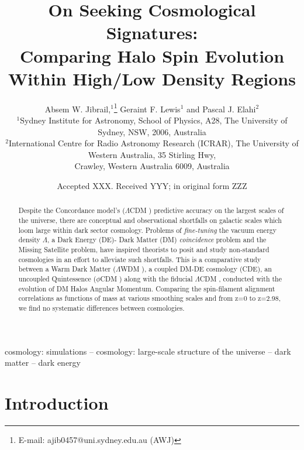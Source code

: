 \documentclass[a4paper,fleqn,usenatbib]{mnras}
\title[Seeking cosmological signatures Within \textit{N}-Body Simulations]{On Seeking Cosmological Signatures:\\ Comparing Halo Spin Evolution Within High/Low Density Regions }
\author[A. W. Jibrail et al.]{
Absem W. Jibrail,$^{1}$\thanks{E-mail: ajib0457@uni.sydney.edu.au (AWJ)}
Geraint F. Lewis$^{1}$
and Pascal J. Elahi$^{2}$
\\
$^{1}$Sydney Institute for Astronomy, School of Physics, A28, The University of Sydney, NSW, 2006, Australia\\
$^{2}$International Centre for Radio Astronomy Research (ICRAR), The University of Western Australia, 35 Stirling Hwy, \\
Crawley, Western Australia 6009, Australia}
\date{Accepted XXX. Received YYY; in original form ZZZ}
\def \lcdm{$\Lambda$CDM }
\def \lwdm{$\Lambda$WDM }
\def \qcdm{$\phi$CDM }
\begin{document}
\label{firstpage}
\pagerange{\pageref{firstpage}--\pageref{lastpage}}
\maketitle

\begin{abstract}
Despite the Concordance model's (\lcdm) predictive accuracy on the largest scales of the universe, there are conceptual and observational shortfalls on galactic scales which loom large within dark sector cosmology. Problems of \textit{fine-tuning} the vacuum energy density $\Lambda$, a Dark Energy (DE)- Dark Matter (DM) \textit{coincidence} problem and the Missing Satellite problem, have inspired theorists to posit and study non-standard cosmologies in an effort to alleviate such shortfalls. This is a comparative study between a Warm Dark Matter (\lwdm), a coupled DM-DE cosmology (CDE), an uncoupled Quintessence (\qcdm) along with the fiducial \lcdm, conducted with the evolution of DM Halos Angular Momentum. Comparing the spin-filament alignment correlations as functions of mass at various smoothing scales and from z=0 to z=2.98, we find no systematic differences between cosmologies. 

\end{abstract}

\begin{keywords}
cosmology: simulations -- cosmology: large-scale structure of the universe -- dark matter -- dark energy
\end{keywords}



\section{Introduction}\label{intro}
\end{document}
